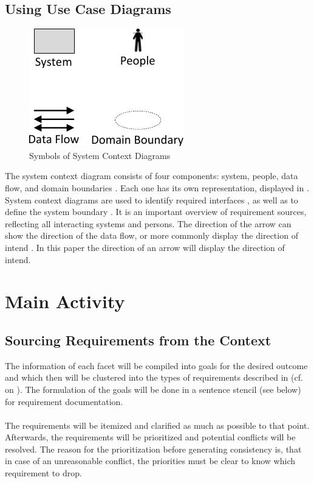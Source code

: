 \subsection{Using Use Case Diagrams}
\begin{figure}[H]
    \centering
    \includegraphics[scale=1]{img/SCDSymbols.pdf}
    \caption[Symbols of System Context Diagrams]{Symbols of System Context Diagrams \parencites[77]{Lauesen.2008}}
    \label{fig:scdSym}
\end{figure}
The system context diagram consists of four components: system, people, data flow, and domain boundaries \parencites[cf.][76-77]{Lauesen.2008}. Each one has its own representation, displayed in . System context diagrams are used to identify required interfaces \parencites[cf.][75]{Lauesen.2008}, as well as to define the system boundary \parencites[cf.][75]{Ebert.2014}. It is an important overview of requirement sources, reflecting all interacting systems and persons. The direction of the arrow can show the direction of the data flow, or more commonly display the direction of intend \parencite[cf.][77]{Lauesen.2008}. In this paper the direction of an arrow will display the direction of intend.


\section{Main Activity}
\subsection{Sourcing Requirements from the Context}
The information of each facet will be compiled into goals for the desired outcome and which then will be clustered into the types of requirements described in  (cf.  on ). The formulation of the goals will be done in a sentence stencil (see below) for requirement documentation. 

\paragraph{} The requirements will be itemized and clarified as much as possible to that point. Afterwards, the requirements will be prioritized and potential conflicts will be resolved. The reason for the prioritization before generating consistency is, that in case of an unreasonable conflict, the priorities must be clear to know which requirement to drop.


